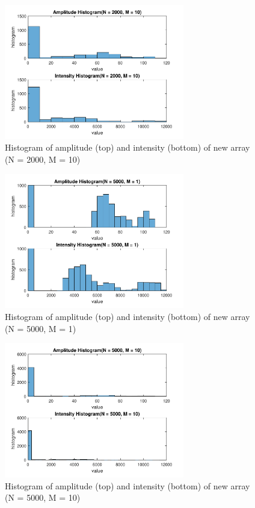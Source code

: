 \documentclass{article}
\begin{document}
\begin{figure}[H]
	\centering
	\includegraphics[width = 0.7\textwidth]{src/2pi/hist_2000_10.pdf}
	\caption{Histogram of amplitude (top) and intensity (bottom) of new array (N = 2000, M = 10)}
	\label{fig:hist-2000-10}
\end{figure}
\begin{figure}[H]
	\centering
	\includegraphics[width = 0.7\textwidth]{src/2pi/hist_5000_1.pdf}
	\caption{Histogram of amplitude (top) and intensity (bottom) of new array (N = 5000, M = 1)}
	\label{fig:hist-5000-1}
\end{figure}
\begin{figure}[H]
	\centering
	\includegraphics[width = 0.7\textwidth]{src/2pi/hist_5000_10.pdf}
	\caption{Histogram of amplitude (top) and intensity (bottom) of new array (N = 5000, M = 10)}
	\label{fig:hist-5000-10}
\end{figure}
\end{document}
